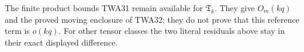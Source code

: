 The finite product bounds TWA31 remain available for
$\mathfrak T_k$. They give $O_m(kq)$ and the proved
moving enclosure of TWA32; they do not prove that
this reference term is $o(kq)$.
For other tensor classes the two literal residuals
above stay in their exact displayed difference.